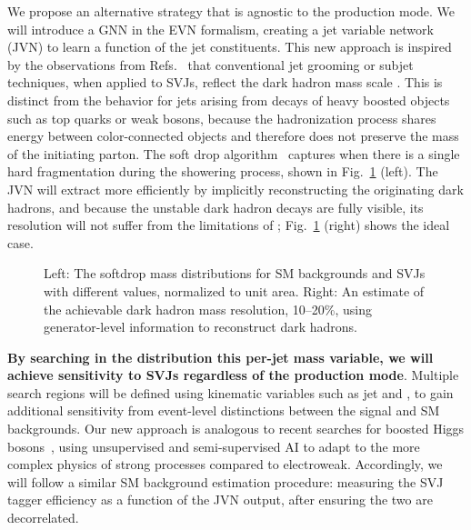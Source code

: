 We propose an alternative strategy that is agnostic to the production mode.
We will introduce a GNN in the EVN formalism, creating a jet variable network (JVN) to learn a function of the jet constituents.
This new approach is inspired by the observations from Refs.~\cite{Strassler:2008fv,CMS:2021dzg} that conventional jet grooming or subjet techniques, when applied to SVJs, reflect the dark hadron mass scale \mdark.
This is distinct from the behavior for jets arising from decays of heavy boosted objects such as top quarks or weak bosons,
because the hadronization process shares energy between color-connected objects and therefore does not preserve the mass of the initiating parton.
The soft drop algorithm~\cite{Larkoski:2014wba} captures \mdark when there is a single hard fragmentation during the showering process, shown in Fig.~\ref{fig:svjmass} (left).
The JVN will extract \mdark more efficiently by implicitly reconstructing the originating dark hadrons,
and because the unstable dark hadron decays are fully visible, its resolution will not suffer from the limitations of \ptmiss;
Fig.~\ref{fig:svjmass} (right) shows the ideal case.

\begin{figure}[htb!]
\centering
{}
\caption{Left: The softdrop mass distributions for SM backgrounds and SVJs with different \mdark values, normalized to unit area.
Right: An estimate of the achievable dark hadron mass resolution, 10--20\%, using generator-level information to reconstruct dark hadrons.}
\label{fig:svjmass}
\end{figure}

\textbf{By searching in the distribution this per-jet mass variable, we will achieve sensitivity to SVJs regardless of the production mode}.
Multiple search regions will be defined using kinematic variables such as jet \pt and \ptmiss,
to gain additional sensitivity from event-level distinctions between the signal and SM backgrounds.
Our new approach is analogous to recent searches for boosted Higgs bosons~\cite{CMS:2020zge},
using unsupervised and semi-supervised AI to adapt to the more complex physics of strong processes compared to electroweak.
Accordingly, we will follow a similar SM background estimation procedure:
measuring the SVJ tagger efficiency as a function of the JVN output, after ensuring the two are decorrelated.


